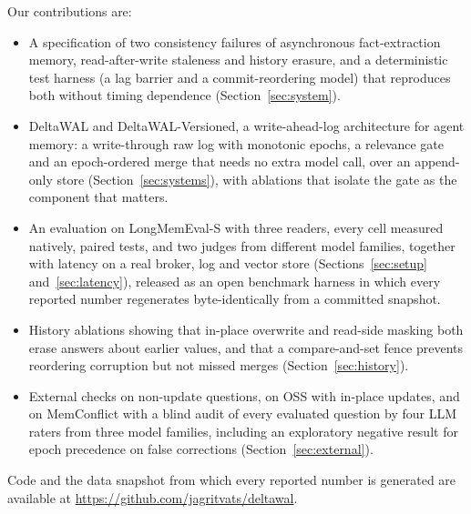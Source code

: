 Our contributions are:
\begin{itemize}
\item A specification of two consistency failures of asynchronous fact-extraction memory, read-after-write staleness and history erasure, and a deterministic test harness (a lag barrier and a commit-reordering model) that reproduces both without timing dependence (Section~\ref{sec:system}).
\item DeltaWAL and DeltaWAL-Versioned, a write-ahead-log architecture for agent memory: a write-through raw log with monotonic epochs, a relevance gate and an epoch-ordered merge that needs no extra model call, over an append-only store (\mbox{Section}~\ref{sec:systems}), with ablations that isolate the gate as the component that matters.
\item An evaluation on LongMemEval-S with three readers, every cell measured natively, paired tests, and two judges from different model families, together with latency on a real broker, log and vector store (Sections~\ref{sec:setup} and~\ref{sec:latency}), released as an open benchmark harness in which every reported number regenerates byte-identically from a committed snapshot.
\item History ablations showing that in-place overwrite and read-side masking both erase answers about earlier values, and that a compare-and-set fence prevents reordering corruption but not missed merges (Section~\ref{sec:history}).
\item External checks on non-update questions, on \memzero{} OSS with in-place updates, and on MemConflict with a blind audit of every evaluated question by four LLM raters from three model families, including an exploratory negative result for epoch precedence on false corrections (Section~\ref{sec:external}).
\end{itemize}
Code and the data snapshot from which every reported number is generated are available at \url{https://github.com/jagritvats/deltawal}.
